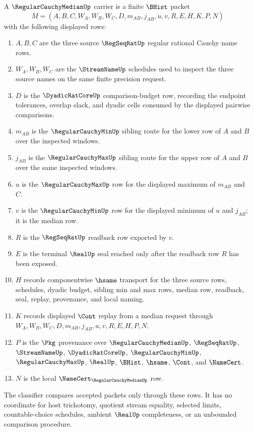 \begin{definition}
\label{def:regular-cauchy-median-carrier}
A $\RegularCauchyMedianUp$ carrier is a finite $\BHist$ packet
$$
M=(A,B,C,W_A,W_B,W_C,D,m_{AB},j_{AB},u,v,R,E,H,K,P,N)
$$
with the following displayed rows:
\begin{enumerate}
\item $A,B,C$ are the three source $\RegSeqRatUp$ regular rational Cauchy name rows.
\item $W_A,W_B,W_C$ are the $\StreamNameUp$ schedules used to inspect the three source names on the same finite precision request.
\item $D$ is the $\DyadicRatCoreUp$ comparison-budget row, recording the endpoint tolerances, overlap slack, and dyadic cells consumed by the displayed pairwise comparisons.
\item $m_{AB}$ is the $\RegularCauchyMinUp$ sibling route for the lower row of $A$ and $B$ over the inspected windows.
\item $j_{AB}$ is the $\RegularCauchyMaxUp$ sibling route for the upper row of $A$ and $B$ over the same inspected windows.
\item $u$ is the $\RegularCauchyMaxUp$ row for the displayed maximum of $m_{AB}$ and $C$.
\item $v$ is the $\RegularCauchyMinUp$ row for the displayed minimum of $u$ and $j_{AB}$; it is the median row.
\item $R$ is the $\RegSeqRatUp$ readback row exported by $v$.
\item $E$ is the terminal $\RealUp$ seal reached only after the readback row $R$ has been exposed.
\item $H$ records componentwise $\hsame$ transport for the three source rows, schedules, dyadic budget, sibling min and max rows, median row, readback, seal, replay, provenance, and local naming.
\item $K$ records displayed $\Cont$ replay from a median request through $W_A,W_B,W_C,D,m_{AB},j_{AB},u,v,R,E,H,P,N$.
\item $P$ is the $\Pkg$ provenance over $\RegularCauchyMedianUp$, $\RegSeqRatUp$, $\StreamNameUp$, $\DyadicRatCoreUp$, $\RegularCauchyMinUp$, $\RegularCauchyMaxUp$, $\RealUp$, $\BHist$, $\hsame$, $\Cont$, and $\NameCert$.
\item $N$ is the local $\NameCert_{\RegularCauchyMedianUp}$ row.
\end{enumerate}
The classifier compares accepted packets only through these rows. It has no coordinate for host trichotomy, quotient stream equality, selected limits, countable-choice schedules, ambient $\RealUp$ completeness, or an unbounded comparison procedure.
\end{definition}

